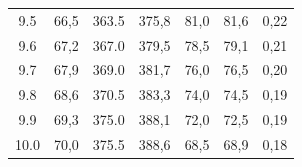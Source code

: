 \documentclass[titlepage = firstcover]{scrartcl}
\begin{document}
\begin{table}[h]
\begin{tabular}{c c c c c c c}
            9.5	                &  66,5              &  363.5          &    375,8       &    81,0         &    81,6        &  0,22 \\
            9.6	                &  67,2              &  367.0          &    379,5       &    78,5         &    79,1        &  0,21 \\
            9.7	                &  67,9              &  369.0          &    381,7       &    76,0         &    76,5        &  0,20 \\
            9.8	                &  68,6              &  370.5          &    383,3       &    74,0         &    74,5        &  0,19 \\
            9.9	                &  69,3              &  375.0          &    388,1       &    72,0         &    72,5        &  0,19 \\
            10.0                &  70,0              &  375.5          &    388,6       &    68,5         &    68,9        &  0,18 \\
            \bottomrule
            
        \end{tabular}
        
    \end{table}
\end{document}

